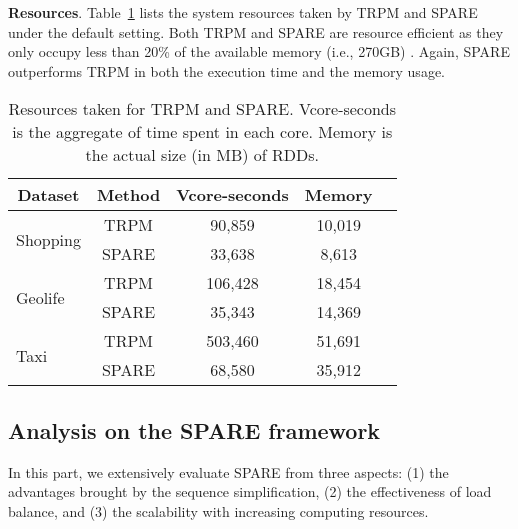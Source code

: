 \textbf{Resources}. Table~\ref{tbl:resource} lists the system resources taken 
by TRPM and SPARE under the default setting. Both TRPM and SPARE are 
resource efficient as they only occupy less than 20\% 
of the available memory (i.e., 270GB) . Again, SPARE outperforms TRPM in both the execution time and the memory usage.


\begin{table}[h]
\centering
\caption{Resources taken for TRPM and SPARE. Vcore-seconds is the aggregate of time spent in each core. Memory is the actual size (in MB) of RDDs.}
\label{tbl:resource}
\begin{tabular}{|l|c|c|c|c|}
\hline
\multicolumn{1}{|c|}{\textbf{Dataset}} & \textbf{Method} 
& \textbf{Vcore-seconds} & \textbf{Memory} \\ \hline
\multirow{2}{*}{Shopping}              & TRPM           
                               & 90,859                 & 10,019               \\ 
                                       & SPARE           
                                                                      & 33,638                 & 8,613                \\ \hline
\multirow{2}{*}{Geolife}               & TRPM            
                              & 106,428                & 18,454               \\
                                       & SPARE            
                                                                     & 35,343                 & 14,369               \\ \hline
\multirow{2}{*}{Taxi}                  & TRPM            
                           & 503,460                & 51,691               \\ 
                                       & SPARE           
                                                                    & 68,580                & 35,912               \\ \hline
\end{tabular}
\end{table}

\subsection{Analysis on the SPARE framework}
In this part, we extensively evaluate SPARE from three aspects:
(1) the advantages brought by the sequence simplification, (2) the effectiveness of load balance, and (3) the scalability with increasing computing resources.


